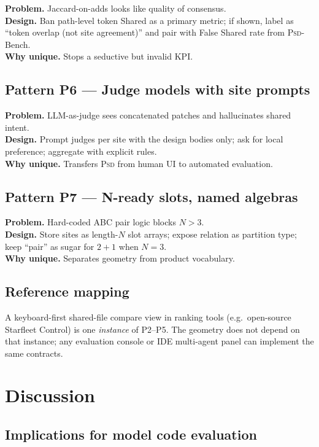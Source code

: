 \documentclass[
  11pt,
  a4paper,
  oneside,
  numbers=noenddot,
  abstract=true,
  headings=normal,
  DIV=11,
  BCOR=0mm,
]{scrartcl}
\theoremstyle{definition}
\theoremstyle{plain}
\theoremstyle{remark}
\newcommand{\PSD}{\textsc{Psd}}
\begin{document}
\textbf{Problem.} Jaccard-on-adds looks like quality of consensus.\\
\textbf{Design.} Ban path-level token Shared as a primary metric; if shown,
label as ``token overlap (not site agreement)'' and pair with False Shared
rate from \PSD{}-Bench.\\
\textbf{Why unique.} Stops a seductive but invalid KPI.

\subsection{Pattern P6 --- Judge models with site prompts}

\textbf{Problem.} LLM-as-judge sees concatenated patches and hallucinates
shared intent.\\
\textbf{Design.} Prompt judges per site with the design bodies only; ask
for local preference; aggregate with explicit rules.\\
\textbf{Why unique.} Transfers \PSD{} from human UI to automated evaluation.

\subsection{Pattern P7 --- N-ready slots, named algebras}

\textbf{Problem.} Hard-coded ABC pair logic blocks $N{>}3$.\\
\textbf{Design.} Store sites as length-$N$ slot arrays; expose relation as
partition type; keep ``pair'' as sugar for $2{+}1$ when $N=3$.\\
\textbf{Why unique.} Separates geometry from product vocabulary.

\subsection{Reference mapping}

A keyboard-first shared-file compare view in ranking tools (e.g.\ open-source
Starfleet Control) is one \emph{instance} of P2--P5. The geometry does not
depend on that instance; any evaluation console or IDE multi-agent panel
can implement the same contracts.

\section{Discussion}
\label{sec:discussion}

\subsection{Implications for model code evaluation}
\end{document}
